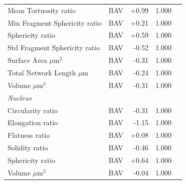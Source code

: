 \documentclass[11pt,a4paper]{article}
\begin{document}
\begin{longtable}{llrrr}
  Mean Tortuosity ratio & BAV & +0.99 & 1.000 &  \\
  Min Fragment Sphericity ratio & BAV & +0.21 & 1.000 &  \\
  Sphericity ratio & BAV & +0.59 & 1.000 &  \\
  Std Fragment Sphericity ratio & BAV & -0.52 & 1.000 &  \\
  Surface Area $\mu$m$^{2}$ & BAV & -0.31 & 1.000 &  \\
  Total Network Length $\mu$m & BAV & -0.24 & 1.000 &  \\
  Volume $\mu$m$^{3}$ & BAV & -0.31 & 1.000 &  \\
\midrule
\multicolumn{5}{l}{\textit{Nucleus}} \\
  Circularity ratio & BAV & -0.31 & 1.000 &  \\
  Elongation ratio & BAV & -1.15 & 1.000 &  \\
  Flatness ratio & BAV & +0.08 & 1.000 &  \\
  Solidity ratio & BAV & -0.46 & 1.000 &  \\
  Sphericity ratio & BAV & +0.64 & 1.000 &  \\
  Volume $\mu$m$^{3}$ & BAV & -0.04 & 1.000 &  \\
\bottomrule
\end{longtable}
\end{document}
